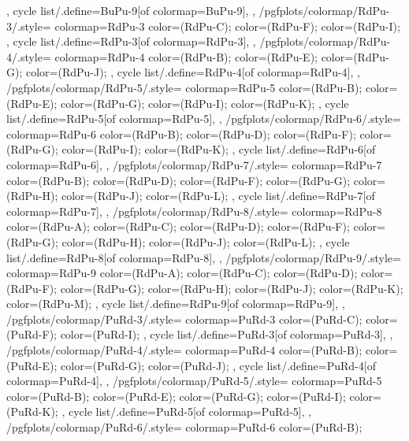 {{{    },
    cycle list/.define={BuPu-9}{[of colormap=BuPu-9]},
  },
  /pgfplots/colormap/RdPu-3/.style={
    colormap={RdPu-3}{
      color=(RdPu-C);
      color=(RdPu-F);
      color=(RdPu-I);
    },
    cycle list/.define={RdPu-3}{[of colormap=RdPu-3]},
  },
  /pgfplots/colormap/RdPu-4/.style={
    colormap={RdPu-4}{
      color=(RdPu-B);
      color=(RdPu-E);
      color=(RdPu-G);
      color=(RdPu-J);
    },
    cycle list/.define={RdPu-4}{[of colormap=RdPu-4]},
  },
  /pgfplots/colormap/RdPu-5/.style={
    colormap={RdPu-5}{
      color=(RdPu-B);
      color=(RdPu-E);
      color=(RdPu-G);
      color=(RdPu-I);
      color=(RdPu-K);
    },
    cycle list/.define={RdPu-5}{[of colormap=RdPu-5]},
  },
  /pgfplots/colormap/RdPu-6/.style={
    colormap={RdPu-6}{
      color=(RdPu-B);
      color=(RdPu-D);
      color=(RdPu-F);
      color=(RdPu-G);
      color=(RdPu-I);
      color=(RdPu-K);
    },
    cycle list/.define={RdPu-6}{[of colormap=RdPu-6]},
  },
  /pgfplots/colormap/RdPu-7/.style={
    colormap={RdPu-7}{
      color=(RdPu-B);
      color=(RdPu-D);
      color=(RdPu-F);
      color=(RdPu-G);
      color=(RdPu-H);
      color=(RdPu-J);
      color=(RdPu-L);
    },
    cycle list/.define={RdPu-7}{[of colormap=RdPu-7]},
  },
  /pgfplots/colormap/RdPu-8/.style={
    colormap={RdPu-8}{
      color=(RdPu-A);
      color=(RdPu-C);
      color=(RdPu-D);
      color=(RdPu-F);
      color=(RdPu-G);
      color=(RdPu-H);
      color=(RdPu-J);
      color=(RdPu-L);
    },
    cycle list/.define={RdPu-8}{[of colormap=RdPu-8]},
  },
  /pgfplots/colormap/RdPu-9/.style={
    colormap={RdPu-9}{
      color=(RdPu-A);
      color=(RdPu-C);
      color=(RdPu-D);
      color=(RdPu-F);
      color=(RdPu-G);
      color=(RdPu-H);
      color=(RdPu-J);
      color=(RdPu-K);
      color=(RdPu-M);
    },
    cycle list/.define={RdPu-9}{[of colormap=RdPu-9]},
  },
  /pgfplots/colormap/PuRd-3/.style={
    colormap={PuRd-3}{
      color=(PuRd-C);
      color=(PuRd-F);
      color=(PuRd-I);
    },
    cycle list/.define={PuRd-3}{[of colormap=PuRd-3]},
  },
  /pgfplots/colormap/PuRd-4/.style={
    colormap={PuRd-4}{
      color=(PuRd-B);
      color=(PuRd-E);
      color=(PuRd-G);
      color=(PuRd-J);
    },
    cycle list/.define={PuRd-4}{[of colormap=PuRd-4]},
  },
  /pgfplots/colormap/PuRd-5/.style={
    colormap={PuRd-5}{
      color=(PuRd-B);
      color=(PuRd-E);
      color=(PuRd-G);
      color=(PuRd-I);
      color=(PuRd-K);
    },
    cycle list/.define={PuRd-5}{[of colormap=PuRd-5]},
  },
  /pgfplots/colormap/PuRd-6/.style={
    colormap={PuRd-6}{
      color=(PuRd-B);
}}}
